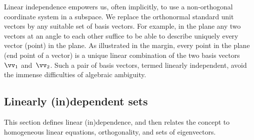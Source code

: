 Linear independence empowers us, often implicitly, to use a non-orthogonal coordinate system in a subspace.
We replace the orthonormal standard unit vectors by any suitable set of basis vectors.
%
For example, in the plane any two vectors at an angle to each other suffice to be able to describe uniquely every vector (point) in the plane.
As illustrated in the margin, every point in the plane (end point of a vector) is a unique linear combination of the two basis vectors~\(\vv_1\) and~\(\vv_2\).
Such a pair of basis vectors, termed linearly independent, avoid the immense difficulties of algebraic ambiguity.



\subsection{Linearly (in)dependent sets}

This section defines linear (in)dependence, and then relates the concept to homogeneous linear equations, orthogonality, and sets of eigenvectors.

